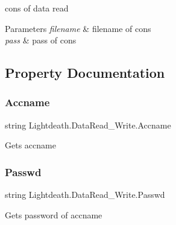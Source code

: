 cons of data read 


\begin{DoxyParams}{Parameters}
{\em filename} & filename of cons\\
\hline
{\em pass} & pass of cons\\
\hline
\end{DoxyParams}


\subsection{Property Documentation}
\hypertarget{class_lightdeath_1_1_data_read___write_af61fd94a64f45b7377dc5f18f29b9869}{}\label{class_lightdeath_1_1_data_read___write_af61fd94a64f45b7377dc5f18f29b9869} 
\subsubsection{\texorpdfstring{Accname}{Accname}}
{\footnotesize\ttfamily string Lightdeath.\+Data\+Read\+\_\+\+Write.\+Accname\hspace{0.3cm}{\ttfamily [get]}}



Gets accname 

\hypertarget{class_lightdeath_1_1_data_read___write_a63347e71b1ec50329e76e483c6409d81}{}\label{class_lightdeath_1_1_data_read___write_a63347e71b1ec50329e76e483c6409d81} 
\subsubsection{\texorpdfstring{Passwd}{Passwd}}
{\footnotesize\ttfamily string Lightdeath.\+Data\+Read\+\_\+\+Write.\+Passwd\hspace{0.3cm}{\ttfamily [get]}}



Gets password of accname 

\hypertarget{class_lightdeath_1_1_data_read___write_a9b5be8a536b39a23b0fb8d3aa21f5614}{}\label{class_lightdeath_1_1_data_read___write_a9b5be8a536b39a23b0fb8d3aa21f5614} 
